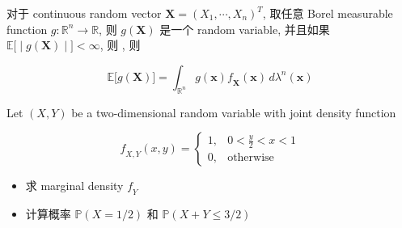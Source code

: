 \begin{theorem}

对于 continuous random vector \(\mathbf{X} = (\mathit{X}_{1},\cdots,\mathit{X}_{\mathit{n}})^{\mathit{T}}\), 取任意 Borel measurable function \(\mathit{g}:\mathbb{R}^{\mathit{n}}\rightarrow\mathbb{R}\), 则 \(\mathit{g}(\mathbf{X})\) 是一个 random variable, 并且如果 \(\left. \mathbb{E}\lbrack \middle| \mathit{g}(\mathbf{X}) \middle| \rbrack < \infty \right.\), 则 , 则

\[\mathbb{E}\lbrack\mathit{g}(\mathbf{X})\rbrack = \int_{\mathbb{R}^{\mathit{n}}}\mathit{g}(\mathbf{x})\mathit{f}_{\mathbf{X}}(\mathbf{x})\,\mathit{d}\mathit{\lambda}^{\mathit{n}}(\mathbf{x})\]

\end{theorem}

\begin{example}

Let \((\mathit{X},\mathit{Y})\) be a two-dimensional random variable with joint density function

\[\mathit{f}_{\mathit{X},\mathit{Y}}(\mathit{x},\mathit{y}) = \left\{ \begin{matrix}
{1,} & {0 < \frac{\mathit{y}}{2} < \mathit{x} < 1} \\
{0,} & \text{otherwise}
\end{matrix} \right.\]

\begin{itemize}
\item
  求 marginal density \(\mathit{f}_{\mathit{Y}}\)
\item
  计算概率 \(\mathbb{P}(\mathit{X} = 1/2)\) 和 \(\mathbb{P}(\mathit{X} + \mathit{Y} \leq 3/2)\)
\end{itemize}

\end{example}


